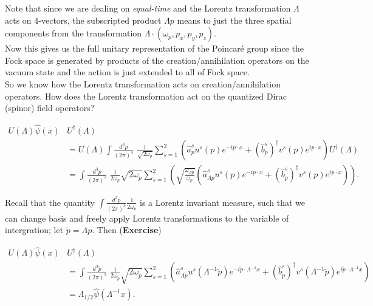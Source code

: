 \noindent Note that since we are dealing on \textit{equal-time} and the Lorentz transformation $\Lambda$ acts on 4-vectors, the subscripted product $\Lambda p$ means to just the three spatial components from the transformation $\Lambda \cdot (\omega_p, p_x, p_y, p_z)$. \\

\noindent Now this gives us the full unitary representation of the Poincar\'e group since the Fock space is generated by products of the creation/annihilation operators on the vacuum state and the action is just extended to all of Fock space. \\

\noindent So we know how the Lorentz transformation acts on creation/annihilation operators. How does the Lorentz transformation act on the quantized Dirac (spinor) field operators?

\begin{align*}
U(\Lambda) \hat{\psi}(x)&  U^\dagger (\Lambda) \\
&= U(\Lambda) \int \frac{d^3 p}{(2 \pi)^3} \,\, \frac{1}{\sqrt{2 \omega_p}} \sum_{s=1}^2 \left( \hat{a}_p^s u^s(p) e^{-i p \cdot x} + (\hat{b}_{p}^s)^\dagger v^s(p) e^{i p \cdot x} \right) U^\dagger (\Lambda) \\
&= \int \frac{d^3 p}{(2 \pi)^3} \,\, \frac{1}{2 \omega_p} \sqrt{2 \omega_p} \sum_{s=1}^2 \left( \sqrt{\frac{\omega_{\Lambda p}}{\omega_p}} \left( \hat{a}_{\Lambda p}^s u^s (p) e^{-ip \cdot x} + (\hat{b}_{p}^s)^\dagger v^s(p) e^{i p \cdot x} \right) \right).
\end{align*}

\noindent Recall that the quantity $\int \frac{d^3 p}{(2 \pi)^3} \frac{1}{2 \omega_p}$ is a Lorentz invariant measure, such that we can change basis and freely apply Lorentz transformations to the variable of intergration; let $\widetilde{p} = \Lambda p$. Then (\textbf{Exercise})

\begin{align*}
U(\Lambda) \hat{\psi}(x)&  U^\dagger (\Lambda) \\
&= \int \frac{d^3 \widetilde{p}}{(2 \pi)^3} \,\, \frac{1}{2 \omega_{\widetilde{p}}} \sqrt{2 \omega_{\widetilde{p}}} \sum_{s=1}^2 \left( \hat{a}_{\Lambda \widetilde{p}}^s u^s (\Lambda^{-1} \widetilde{p}) e^{-i \widetilde{p} \cdot \Lambda^{-1} x} + (\hat{b}_{\widetilde{p}}^s)^\dagger v^s(\Lambda^{-1} \widetilde{p}) e^{i \widetilde{p} \cdot \Lambda^{-1} x} \right) \\
&= \Lambda_{1/2} \hat{\psi} (\Lambda^{-1} x).
\end{align*}

